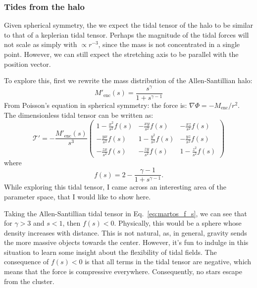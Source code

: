         \subsubsection{Tides from the halo}
            Given spherical symmetry, the we expect the tidal tensor of the halo to be similar to that of a keplerian tidal tensor. Perhaps the magnitude of the tidal forces will not scale as simply with $\propto r^{-3}$, since the mass is not concentrated in a single point. However, we can still expect the stretching axis to be parallel with the position vector. 
            
            To explore this, first we rewrite the mass distribution of the Allen-Santillian halo:
            \begin{equation}
                M'_\text{enc}(s) = \frac{s^\gamma}{1+s^{\gamma-1}}
            \end{equation}
            From Poisson's equation in spherical symmetry: the force is: $\nabla \Phi = - M_\mathrm{enc}/r^2$. The dimensionless tidal tensor can be written as: 
            \begin{equation}
                \mathcal{T'}= -\frac{M'_\text{enc}(s)}{s^3}\left(\begin{matrix}
                    1-\frac{x^2}{s^2}f(s) & -\frac{xy}{s^2}f(s) & -\frac{xz}{s^2}f(s) \\
                    -\frac{yx}{s^2}f(s) & 1-\frac{y^2}{s^2}f(s) & -\frac{yz}{s^2}f(s) \\
                    -\frac{zx}{s^2}f(s) & -\frac{zy}{s^2}f(s) & 1-\frac{z^2}{s^2}f(s)
                \end{matrix}\right)
            \end{equation}  
            where 
            \begin{equation}
                f(s) = 2-\frac{\gamma-1}{1+s^{\gamma-1}}.
                \label{eq:martos_f_s}
            \end{equation}
            While exploring this tidal tensor, I came across an interesting area of the parameter space, that I would like to show here. 

            Taking the Allen-Santillian tidal tensor in Eq.~\ref{eq:martos_f_s}, we can see that for $\gamma > 3$ and $s <  1$, then $f(s)< 0$. Physically, this would be a sphere whose density increases with distance. This is not natural, as, in general, gravity sends the more massive objects towards the center. However, it's fun to indulge in this situation to learn some insight about the flexibility of tidal fields. The consequence of $f(s)< 0$ is that all terms in the tidal tensor are negative, which means that the force is compressive everywhere. Consequently, no stars escape from the cluster. 

